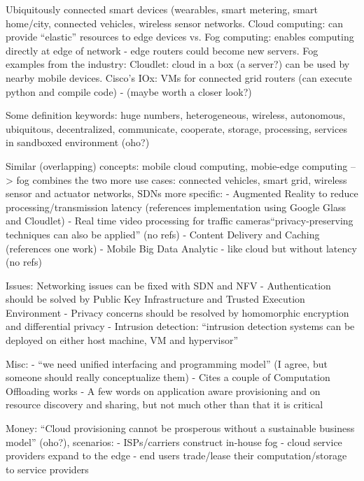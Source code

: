 Ubiquitously connected smart devices (wearables, smart metering, smart home/city, connected vehicles, wireless sensor networks.
Cloud computing: can provide ``elastic'' resources to edge devices
vs.
Fog computing: enables computing directly at edge of network - edge routers could become new servers.
Fog examples from the industry:
Cloudlet: cloud in a box (a server?) can be used by nearby mobile devices.
Cisco's IOx: VMs for connected grid routers (can execute python and compile code) - (maybe worth a closer look?)

Some definition keywords: huge numbers, heterogeneous, wireless, autonomous, ubiquitous, decentralized, communicate, cooperate, storage, processing, services in sandboxed environment (oho?)

Similar (overlapping) concepts: mobile cloud computing, mobie-edge computing --> fog combines the two
more use cases: connected vehicles, smart grid, wireless sensor and actuator networks, SDNs
more specific:
- Augmented Reality to reduce processing/transmission latency (references implementation using Google Glass and Cloudlet)
- Real time video processing for traffic cameras``privacy-preserving techniques can also be applied'' (no refs)
- Content Delivery and Caching (references one work)
- Mobile Big Data Analytic - like cloud but without latency (no refs)

Issues:
Networking issues can be fixed with SDN and NFV
- Authentication should be solved by Public Key Infrastructure and Trusted Execution Environment
- Privacy concerns should be resolved by homomorphic encryption and differential privacy
- Intrusion detection: ``intrusion detection systems can be deployed on either host machine, VM and hypervisor''

Misc:
- ``we need unified interfacing and programming model'' (I agree, but someone should really conceptualize them)
- Cites a couple of Computation Offloading works
- A few words on application aware provisioning and on resource discovery and sharing, but not much other than that it is critical

Money:
``Cloud provisioning cannot be prosperous without a sustainable business model'' (oho?), scenarios:
- ISPs/carriers construct in-house fog
- cloud service providers expand to the edge
- end users trade/lease their computation/storage to service providers




